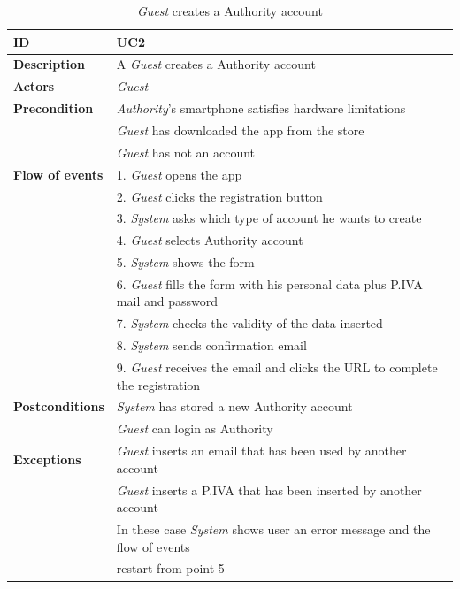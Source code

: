 \documentclass{article}
\begin{document}
\begin{table}
    \begin{center}
    \centering
\begin{tabular}{ | l | l |}
\hline
\textbf{ID} & UC2 \\
\hline
\textbf{Description} & A \textit{Guest} creates a Authority account \\
\hline
\textbf{Actors} & \textit{Guest} \\
\hline
\textbf{Precondition} & \textit{Authority}'s smartphone satisfies hardware limitations \\
             & \textit{Guest} has downloaded the app from the store \\
             & \textit{Guest} has not an account\\ 
\hline
\textbf{Flow of events} & 1. \textit{Guest} opens the app \\
                        & 2. \textit{Guest} clicks the registration button \\
                        & 3. \textit{System} asks which type of account he wants to create \\
                        & 4. \textit{Guest} selects Authority account \\
                        & 5. \textit{System} shows the form \\
                        & 6. \textit{Guest} fills the form with his personal data plus P.IVA mail and password \\
                        & 7. \textit{System} checks the validity of the data inserted \\
                        & 8. \textit{System} sends confirmation email \\
                        & 9. \textit{Guest} receives the email and clicks the URL to complete the registration \\  
\hline
\textbf{Postconditions} & \textit{System} has stored a new Authority account  \\
                        & \textit{Guest} can login as Authority \\
\hline
\textbf{Exceptions} & \textit{Guest} inserts an email that has been used by another account \\
                    & \textit{Guest} inserts a P.IVA that has been inserted by another account \\
                    & In these case \textit{System} shows user an error message and the flow of events  \\
                    & restart from point 5 \\  
\hline
\end{tabular}
\caption{\textit{Guest} creates a Authority account}
\end{center}
\end{table}
\end{document}

